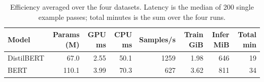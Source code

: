 \begin{table}[t]
\centering
\footnotesize
\caption{Efficiency averaged over the four datasets. Latency is the median of 200 single example passes; total minutes is the sum over the four runs.}
\label{tab:eff}
\begin{tabular}{lrrrrrrr}
\toprule
Model & Params (M) & GPU ms & CPU ms & Samples/s & Train GiB & Infer MiB & Total min \\
\midrule
DistilBERT & 67.0 & 2.55 & 50.1 & 1259 & 1.98 & 646 & 19 \\
BERT & 110.1 & 3.99 & 70.3 & 627 & 3.62 & 811 & 34 \\
\bottomrule
\end{tabular}
\end{table}
